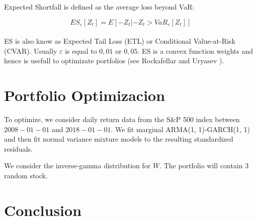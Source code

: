 \documentclass[12pt]{article}
\begin{document}
Expected Shortfall is defined as the average loss beyond VaR:

\begin{equation}
ES_{\varepsilon}[Z_{t}]=E[-Z_{t} | -Z_{t} > VaR_{\varepsilon}[Z_{t}]]
\label{eq_sdfsdfdsf09f0ifmsfi9}
\end{equation}\\


ES is also know as Expected Tail Loss (ETL) or Conditional Value-at-Risk (CVAR). Usually $\varepsilon$ is equal to $0,01$ or $0,05$. ES is a convex function weights and hence is usefull to optimizate portfolios (see Rockafellar and Uryasev \cite{RockafellarUryasev}).







\section{Portfolio Optimizacion}

To optimize, we consider daily return data from the S\&P 500 index between $2008-01-01$ and
$2018-01-01$. We fit marginal ARMA(1, 1)-GARCH(1, 1) and then fit normal variance
mixture models to the resulting standardized residuals.

We consider the inverse-gamma distribution for $W$. The portfolio will contain 3 random stock.








\section{Conclusion}




\clearpage
\end{document}
